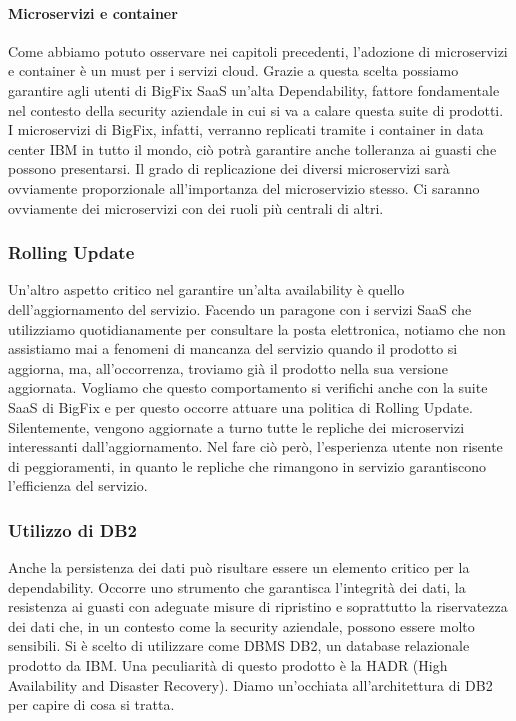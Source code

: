 \paragraph{Microservizi e container}
Come abbiamo potuto osservare nei capitoli precedenti, l'adozione di microservizi e container è un must per i servizi cloud. Grazie a questa scelta possiamo garantire agli utenti di BigFix SaaS un'alta Dependability, fattore fondamentale nel contesto della security aziendale in cui si va a calare questa suite di prodotti. I microservizi di BigFix, infatti, verranno replicati tramite i container in data center IBM in tutto il mondo, ciò potrà garantire anche tolleranza ai guasti che possono presentarsi. Il grado di replicazione dei diversi microservizi sarà ovviamente proporzionale all'importanza del microservizio stesso. Ci saranno ovviamente dei microservizi con dei ruoli più centrali di altri.

\subsubsection{Rolling Update}
Un'altro aspetto critico nel garantire un'alta availability è quello dell'aggiornamento del servizio. Facendo un paragone con i servizi SaaS che utilizziamo quotidianamente per consultare la posta elettronica, notiamo che non assistiamo mai a fenomeni di mancanza del servizio quando il prodotto si aggiorna, ma, all'occorrenza, troviamo già il prodotto nella sua versione aggiornata. Vogliamo che questo comportamento si verifichi anche con la suite SaaS di BigFix e per questo occorre attuare una politica di Rolling Update. Silentemente, vengono aggiornate a turno tutte le repliche dei microservizi interessanti dall'aggiornamento. Nel fare ciò però, l'esperienza utente non risente di peggioramenti, in quanto le repliche che rimangono in servizio garantiscono l'efficienza del servizio.

\subsubsection{Utilizzo di DB2}
Anche la persistenza dei dati può risultare essere un elemento critico per la dependability. Occorre uno strumento che garantisca l'integrità dei dati, la resistenza ai guasti con adeguate misure di ripristino e soprattutto la riservatezza dei dati che, in un contesto come la security aziendale, possono essere molto sensibili. Si è scelto di utilizzare come DBMS DB2, un database relazionale prodotto da IBM. Una peculiarità di questo prodotto è la HADR (High Availability and Disaster Recovery). Diamo un'occhiata all'architettura di DB2 per capire di cosa si tratta.

